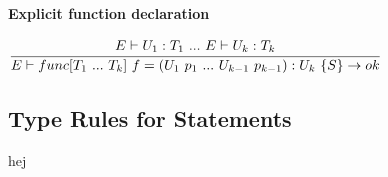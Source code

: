 \textbf{Explicit function declaration}\\
\begin{center}
	\begin{math}
		\cfrac
		{E \vdash U_1 : T_1\ 
		.
		.
		.
		\ E \vdash U_k : T_k}
		{E \vdash func[T_1\
			.
			.
			.
			\ T_k]\ f = (U_1\ p_1\
			.
			.
			.
			\ U_{k-1}\ p_{k-1}): U_k\ \{ S \} \rightarrow ok}
	\end{math}
\end{center}


\subsection{Type Rules for Statements}
hej

